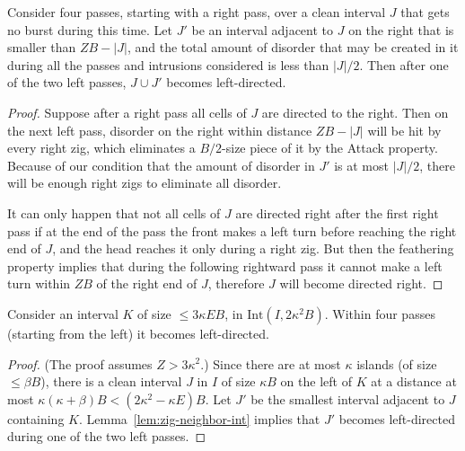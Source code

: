 \documentclass[11pt]{memoir}
\theoremstyle{definition} %
\renewcommand{\le}{\leq}
\def\B{B}
\newcommand{\E}{E}
\newcommand{\Int}{\mathrm{Int}}
\newcommand{\Z}{Z}
\begin{document}
\begin{lemma}\label{lem:zig-neighbor-int}
  Consider four passes, starting with a right pass,
  over a clean interval \( J \) that gets no burst during this time.
  Let \( J' \) be an interval adjacent to \( J \) on the right that is smaller than \( \Z\B-|J| \),
  and the total amount of disorder that may be created in it during all the passes and intrusions considered is
  less than \( |J|/2 \).
  Then after one of the two left passes, \( J\cup J' \) becomes left-directed. 
\end{lemma}
\begin{proof}
  Suppose after a right pass all cells of \( J \) are directed to the right.
  Then on the next left pass,  disorder on the right within distance \( \Z\B-|J| \)
  will be hit by every right zig, which eliminates a \( \B/2 \)-size piece of it by the Attack property.
  Because of our condition that the amount of disorder in \( J' \) is at most \( |J|/2 \), there will be enough
  right zigs to eliminate all disorder.

  It can only happen that not all cells of \( J \) are directed right after the first right pass
  if at the end of the pass
  the front makes a left turn before reaching the right end of \( J \), and the head reaches it only
during a right zig.
  But then the feathering property implies that 
  during the following rightward pass it cannot make a left turn within \( \Z\B \) of the right end of \( J \),
  therefore \( J \) will become directed right.
\end{proof}

\begin{lemma}\label{lem:left-dir-self}
  Consider an interval \( K \) of size \( \le 3\kappa\E\B \), in \( \Int(I, 2\kappa^{2}\B) \).
  Within four passes (starting from the left) it becomes left-directed.
\end{lemma}
\begin{proof}
(The proof assumes \( \Z>3\kappa^{2} \).)
Since there are at most \( \kappa \) islands (of size \( \le\beta\B \)),
there is a clean interval \( J \) in \( I \) of size \( \kappa\B \)
on the left of \( K \) at a distance at most
\( \kappa(\kappa+\beta)\B<(2\kappa^{2}-\kappa\E)\B \).
  Let \( J' \) be the smallest interval adjacent to \( J \) containing \( K \).
  Lemma~\ref{lem:zig-neighbor-int} implies that \( J' \) becomes left-directed
  during one of the two left passes.
\end{proof}
\end{document}
